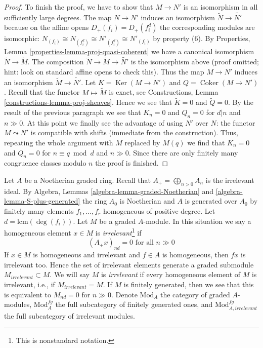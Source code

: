 \documentclass{stacks-project}
\theoremstyle{plain}
\theoremstyle{definition}
\theoremstyle{remark}
\numberwithin{equation}{subsection}
\def\Ker{\mathop{\mathrm{Ker}}}
\def\Coker{\mathop{\mathrm{Coker}}}
\begin{document}
\begin{proof}
\medskip\noindent
To finish the proof, we have to show that $M \to N'$ is an isomorphism
in all sufficiently large degrees. The map $N \to N'$ induces an
isomorphism $\widetilde{N} \to \widetilde{N'}$ because on the affine
opens $D_+(f_i) = D_+(f_i^d)$ the corresponding modules are isomorphic:
$N_{(f_i)} \cong N_{(f_i^d)} \cong N'_{(f_i^d)} \cong N'_{(f_i)}$
by property (6).
By Properties, Lemma \ref{properties-lemma-proj-quasi-coherent}
we have a canonical isomorphism $\widetilde{N} \to \widetilde{M}$.
The composition $\widetilde{N} \to \widetilde{M} \to \widetilde{N'}$
is the isomorphism above (proof omitted; hint: look on standard
affine opens to check this). Thus the map $M \to N'$ induces an isomorphism
$\widetilde{M} \to \widetilde{N'}$.
Let $K = \Ker(M \to N')$ and $Q = \Coker(M \to N')$.
Recall that the functor
$M \mapsto \widetilde{M}$ is exact, see
Constructions, Lemma \ref{constructions-lemma-proj-sheaves}.
Hence we see that $\widetilde{K} = 0$ and $\widetilde{Q} = 0$.
By the result of the previous paragraph we see that $K_n = 0$ and
$Q_n = 0$ for $d | n$ and $n \gg 0$. At this point we finally see
the advantage of using $N'$ over $N$: the functor $M \leadsto N'$
is compatible with shifts (immediate from the construction).
Thus, repeating the whole argument with $M$ replaced by $M(q)$
we find that $K_n = 0$ and $Q_n = 0$ for $n \equiv q \bmod d$
and $n \gg 0$. Since there are
only finitely many congruence classes modulo $n$ the proof is finished.
\end{proof}

\noindent
Let $A$ be a Noetherian graded ring. Recall that
$A_+ = \bigoplus_{n > 0} A_n$ is the irrelevant ideal.
By Algebra, Lemmas \ref{algebra-lemma-graded-Noetherian} and
\ref{algebra-lemma-S-plus-generated} the ring $A_0$ is Noetherian
and $A$ is generated over $A_0$ by finitely many elements
$f_1, \ldots, f_r$ homogeneous of positive degree.
Let $d = \text{lcm}(\deg(f_i))$. Let $M$ be a graded $A$-module.
In this situation we say a homogeneous element $x \in M$
is {\it irrelevant}\footnote{This is nonstandard notation.} if
$$
(A_+ x)_{nd} = 0\text{ for all }n \gg 0
$$
If $x \in M$ is homogeneous and irrelevant and $f \in A$
is homogeneous, then $fx$ is irrelevant too. Hence
the set of irrelevant elements generate a graded submodule
$M_{irrelevant} \subset M$. We will say $M$ is {\it irrelevant}
if every homogeneous element of $M$ is irrelevant, i.e.,
if $M_{irrelevant} = M$.
If $M$ is finitely generated, then we see that
this is equivalent to $M_{nd} = 0$ for $n \gg 0$.
Denote $\text{Mod}_A$ the category of graded $A$-modules,
$\text{Mod}^{fg}_A$ the full subcategory of finitely generated ones,
and $\text{Mod}^{fg}_{A, irrelevant}$ the full subcategory of
irrelevant modules.
\end{document}
